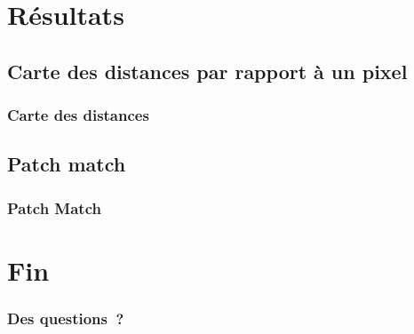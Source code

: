 \documentclass{beamer}
\begin{document}
\section{Résultats}
\subsection{Carte des distances par rapport à un pixel}
\begin{frame}
    \frametitle{Carte des distances}
\end{frame}

\subsection{Patch match}
\begin{frame}
    \frametitle{Patch Match}
\end{frame}


\section*{Fin}
\begin{frame}
    \frametitle{Des questions~?}
\end{frame}
\end{document}
